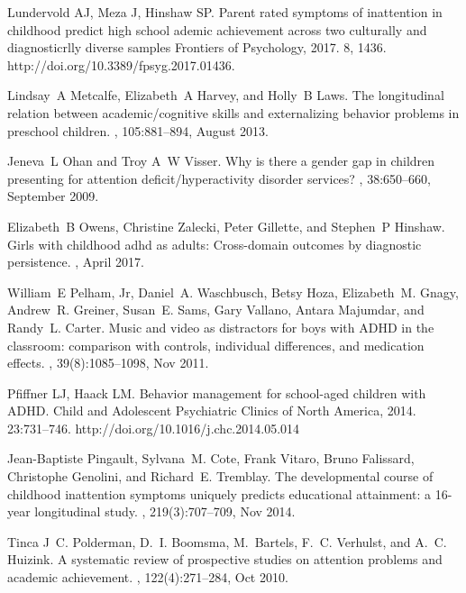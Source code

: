 \documentclass[10pt,letterpaper]{article}
\begin{document}
\begin{thebibliography}{10}
Lundervold  AJ, Meza J, Hinshaw SP.
\newblock Parent rated symptoms of inattention in childhood predict high school ademic achievement across two culturally and diagnosticrlly diverse samples
\newblock Frontiers of Psychology, 2017. 8, 1436. http://doi.org/10.3389/fpsyg.2017.01436.

Lindsay~A Metcalfe, Elizabeth~A Harvey, and Holly~B Laws.
\newblock The longitudinal relation between academic/cognitive skills and
  externalizing behavior problems in preschool children.
, 105:881--894, August 2013.

Jeneva~L Ohan and Troy A~W Visser.
\newblock Why is there a gender gap in children presenting for attention
  deficit/hyperactivity disorder services?
,
  38:650--660, September 2009.

Elizabeth~B Owens, Christine Zalecki, Peter Gillette, and Stephen~P Hinshaw.
\newblock Girls with childhood adhd as adults: Cross-domain outcomes by
  diagnostic persistence.
, April 2017.

William~E Pelham, Jr, Daniel~A. Waschbusch, Betsy Hoza, Elizabeth~M. Gnagy,
  Andrew~R. Greiner, Susan~E. Sams, Gary Vallano, Antara Majumdar, and Randy~L.
  Carter.
\newblock Music and video as distractors for boys with {ADHD} in the classroom:
  comparison with controls, individual differences, and medication effects.
, 39(8):1085--1098, Nov
  2011.

Pfiffner LJ, Haack LM.
\newblock Behavior management for school-aged children with {ADHD}.
\newblock Child and Adolescent Psychiatric Clinics of North America, 2014.
  23:731--746. http://doi.org/10.1016/j.chc.2014.05.014

Jean-Baptiste Pingault, Sylvana~M. Cote, Frank Vitaro, Bruno Falissard,
  Christophe Genolini, and Richard~E. Tremblay.
\newblock The developmental course of childhood inattention symptoms uniquely
  predicts educational attainment: a 16-year longitudinal study.
, 219(3):707--709, Nov 2014.

Tinca J~C. Polderman, D.~I. Boomsma, M.~Bartels, F.~C. Verhulst, and A.~C.
  Huizink.
\newblock A systematic review of prospective studies on attention problems and
  academic achievement.
, 122(4):271--284, Oct 2010.


\end{thebibliography}
\end{document}
